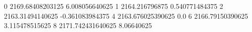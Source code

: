 0 2169.68408203125 6.008056640625
1 2164.216796875 0.540771484375
2 2163.31494140625 -0.361083984375
4 2163.676025390625 0.0
6 2166.79150390625 3.115478515625
8 2171.742431640625 8.06640625
